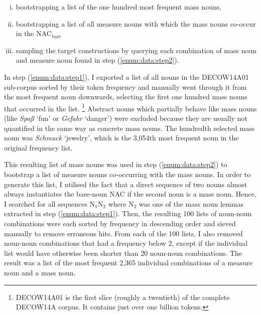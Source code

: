 \documentclass[USenglish]{article}
\newcommand{\Sub}[1]{\ensuremath{\mathrm{_{#1}}}}
\newcommand{\NACb}{NAC\Sub{bare}}
\begin{document}
\begin{enumerate}[i.]
  \item\label{enum:data:step1} bootstrapping a list of the one hundred most frequent mass nouns,
  \item\label{enum:data:step2} bootstrapping a list of all measure nouns with which the mass nouns co-occur in the \NACb 
  \item\label{enum:data:step3} sampling the target constructions by querying each combination of mass noun and measure noun found in step (\ref{enum:data:step2}).
\end{enumerate}

\vspace{-1\baselineskip}

In step (\ref{enum:data:step1}), I exported a list of all nouns in the DECOW14A01 sub-corpus sorted by their token frequency and manually went through it from the most frequent noun downwards, selecting the first one hundred mass nouns that occurred in the list.%
\footnote{DECOW14A01 is the first slice (roughly a twentieth) of the complete DECOW14A corpus.
It contains just over one billion tokens.}
Abstract nouns which partially behave like mass nouns (like \textit{Spaß} `fun’ or \textit{Gefahr} `danger’) were excluded because they are usually not quantified in the same way as concrete mass nouns.
The hundredth selected mass noun was \textit{Schmuck} `jewelry’, which is the 3,054th most frequent noun in the original frequency list.

This resulting list of mass nouns was used in step (\ref{enum:data:step2}) to bootstrap a list of measure nouns co-occurring with the mass nouns. 
In order to generate this list, I utilised the fact that a direct sequence of two nouns almost always instantiates the bare-noun NAC if the second noun is a mass noun.
Hence, I searched for all sequences N\Sub{1}N\Sub{2} where N\Sub{2} was one of the mass noun lemmas extracted in step (\ref{enum:data:step1}).
Then, the resulting 100 lists of noun-noun combinations were each sorted by frequency in descending order and sieved manually to remove erroneous hits.
From each of the 100 lists, I also removed noun-noun combinations that had a frequency below 2, except if the individual list would have otherwise been shorter than 20 noun-noun combinations.
The result was a list of the most frequent 2,365 individual combinations of a measure noun and a mass noun.
\end{document}
